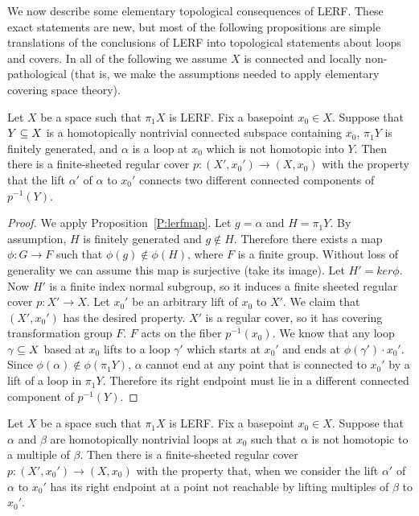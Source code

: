 
We now describe some elementary topological consequences of LERF. These exact
statements are new, but most of the following propositions are simple
translations of the conclusions of LERF into topological statements about loops
and covers. In all of the following we assume $X$ is connected and locally
non-pathological (that is, we make the assumptions needed to apply elementary
covering space theory).

\begin{prop}\label{P:lerf1}

Let $X$ be a space such that $\pi_1X$ is LERF. Fix a basepoint $x_0 \in X$.
Suppose that $Y \subseteq X$ is a homotopically nontrivial connected subspace
containing $x_0$, $\pi_1Y$ is finitely generated, and $\alpha$ is a loop at
$x_0$ which is not homotopic into $Y$.  Then there is a finite-sheeted regular
cover $p \colon (X',x_0') \to (X,x_0)$ with the property that the lift
$\alpha'$ of $\alpha$ to $x_0'$ connects two different connected components of
$p^{-1}(Y)$.

\end{prop}

\begin{proof}

We apply Proposition~\ref{P:lerfmap}. Let $g = \alpha$ and $H = \pi_1Y$. By
assumption, $H$ is finitely generated and $g \notin H$. Therefore there exists
a map $\phi \colon G \to F$ such that $\phi(g) \notin \phi(H)$, where $F$ is
a finite group.  Without loss of generality we can assume this map is
surjective (take its image). Let $H' = ker \phi$. Now $H'$ is a finite index
normal subgroup, so it induces a finite sheeted regular cover $p \colon X' \to
X$.  Let $x_0'$ be an arbitrary lift of $x_0$ to $X'$. We claim that
$(X',x_0')$ has the desired property.  $X'$ is a regular cover, so it has
covering transformation group $F$.  $F$ acts on the fiber $p^{-1}(x_0)$. We
know that any loop $\gamma \subseteq X$ based at $x_0$ lifts to a loop $\gamma'$
which starts at $x_0'$ and ends at $\phi(\gamma') \cdot x_0'$.  Since
$\phi(\alpha) \notin \phi(\pi_1Y)$, $\alpha$ cannot end at any point that is
connected to $x_0'$ by a lift of a loop in $\pi_1Y$.  Therefore its right
endpoint must lie in a different connected component of $p^{-1}(Y)$.

\end{proof}

\begin{prop}\label{P:lerf2}

Let $X$ be a space such that $\pi_1X$ is LERF. Fix a basepoint $x_0 \in X$.
Suppose that $\alpha$ and $\beta$ are homotopically nontrivial loops at $x_0$
such that $\alpha$ is not homotopic to a multiple of $\beta$. Then there is
a finite-sheeted regular cover $p \colon (X',x_0') \to (X,x_0)$ with the
property that, when we consider the lift $\alpha'$ of $\alpha$ to $x_0'$ has
its right endpoint at a point not reachable by lifting multiples of $\beta$ to
$x_0'$.

\end{prop}

